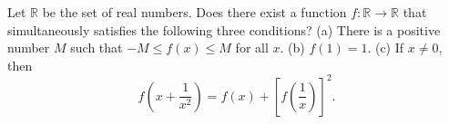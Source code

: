 Let $\mathbb{R}$ be the set of real numbers. Does there exist a function $f : \mathbb{R} \to \mathbb{R}$ that simultaneously satisfies the following three conditions?
(a) There is a positive number $M$ such that $-M \leq f(x) \leq M$ for all $x$.
(b) $f(1) = 1$.
(c) If $x \neq 0$, then
\[ f\left(x + \frac{1}{x^2}\right) = f(x) + \left[f\left(\frac{1}{x}\right)\right]^2. \]
